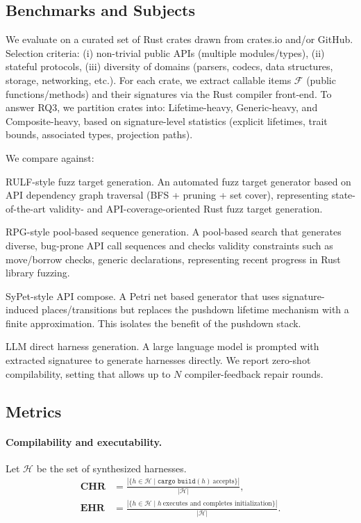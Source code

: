 \documentclass[sigconf]{acmart}
\begin{document}
\subsection{Benchmarks and Subjects}
\label{sec:evaluation:benchmarks}
We evaluate on a curated set of Rust crates drawn from crates.io and/or GitHub. Selection criteria: (i) non-trivial public APIs (multiple modules/types), (ii) stateful protocols, (iii) diversity of domains (parsers, codecs, data structures, storage, networking, etc.). For each crate, we extract callable items $\mathcal{F}$ (public functions/methods) and their signatures via the Rust compiler front-end. To answer RQ3, we partition crates into:
Lifetime-heavy, Generic-heavy, and Composite-heavy, based on signature-level statistics (explicit lifetimes, trait bounds, associated types, projection paths).

We compare against: 

RULF-style fuzz target generation. An automated fuzz target generator based on API dependency graph traversal (BFS + pruning + set cover), representing state-of-the-art validity- and API-coverage-oriented Rust fuzz target generation. 

RPG-style pool-based sequence generation. A pool-based search that generates diverse, bug-prone API call sequences and checks validity constraints such as move/borrow checks, generic declarations, representing recent progress in Rust library fuzzing.

SyPet-style API compose. A Petri net based generator that uses signature-induced places/transitions but replaces the pushdown lifetime mechanism with a finite approximation. This isolates the benefit of the pushdown stack.

LLM direct harness generation. A large language model is prompted with extracted signaturee to generate harnesses directly. We report zero-shot compilability, setting that allows up to $N$ compiler-feedback repair rounds.

\subsection{Metrics}
\label{sec:evaluation:metrics}

\paragraph{Compilability and executability.}
Let $\mathcal{H}$ be the set of synthesized harnesses.
\begin{align}
\textbf{CHR} &= \frac{| \{h\in\mathcal{H}\mid \texttt{cargo build}(h)\ \text{accepts}\} |}{|\mathcal{H}|}, \\
\textbf{EHR} &= \frac{| \{h\in\mathcal{H}\mid h\ \text{executes and completes initialization}\} |}{|\mathcal{H}|}.
\end{align}
\end{document}
